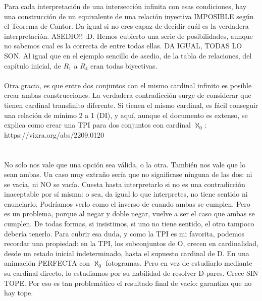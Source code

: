 	\noindent
	Para cada interpretación de una intersección infinita con esas condiciones, hay una construcción de un equivalente de una relación inyectiva IMPOSIBLE según el Teorema de Cantor. Da igual si no eres capaz de decidir cuál es la verdadera interpretación. ASEDIO!! :D. Hemos cubierto una serie de posibilidades, aunque no sabemos cual es la correcta de entre todas ellas. DA IGUAL, TODAS LO SON. Al igual que en el ejemplo sencillo de asedio, de la tabla de relaciones, del capítulo inicial, de $R_{1}$ a $R_{4}$ eran todas biyectivas. 
	\\\\
	
	\noindent
	Otra gracia, es que entre dos conjuntos con el mismo cardinal infinito es posible crear ambas construcciones. La verdadera contradicción surge de considerar que tienen cardinal transfinito diferente. Si tienen el mismo cardinal, es fácil conseguir una relación de mínimo 2 a 1 (DI), y aquí, aunque el documento es extenso, se explica como crear una TPI para dos conjuntos con cardinal $\aleph_{0}$:\\
	https://vixra.org/abs/2209.0120\\
	\\\\
	
	\noindent
	No solo nos vale que una opción sea válida, o la otra. También nos vale que lo sean ambas. Un caso muy extraño sería que no significase ninguna de las dos: ni se vacía, ni NO se vacía. Cuesta hasta interpretarlo si no es una contradicción inaceptable por sí misma: o sea, da igual lo que interpretes,  no tiene sentido ni enunciarlo. Podríamos verlo como el inverso de cuando ambas se cumplen. Pero es un problema, porque al negar y doble negar, vuelve a ser el caso que ambas se cumplen. De todas formas, si insistimos, si uno no tiene sentido, el otro tampoco debería tenerlo. Para cubrir esa duda, y como la TPI es mi favorita, podemos recordar una propiedad: en la TPI, los subconjuntos de O, crecen en cardinalidad, desde un estado inicial indeterminado, hasta el supuesto cardinal de D. En una animación PERFECTA con $\aleph_{0}$ fotogramas. Pero en vez de estudiarlo mediante su cardinal directo, lo estudiamos por su habilidad de resolver D-pares. Crece SIN TOPE. Por eso es tan problemático el resultado final de vacío: garantiza que no hay tope.
	\\\\
	
